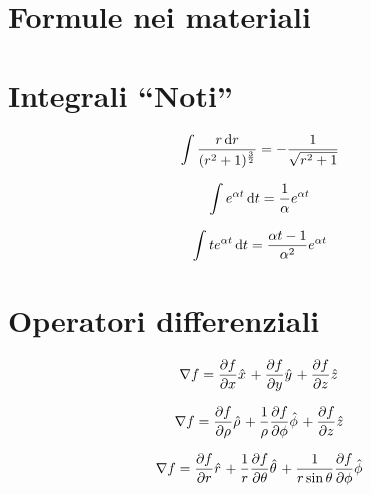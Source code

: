 \documentclass[a4paper,10pt]{article}
\begin{document}
\begin{multicols}{2}

\section{Formule nei materiali}


\section{Integrali ``Noti''}
\begin{equation*}
  \int \frac{r \,\mathrm d r}{(r^2+1)^{\frac{3}{2}}} = - \frac{1}{\sqrt{r^2 + 1}}
\end{equation*}

\begin{equation*}
  \int e^{\alpha t} \,\mathrm d t = \frac{1}{\alpha} e^{\alpha t}
\end{equation*}

\begin{equation*}
  \int t e^{\alpha t} \,\mathrm d t = \frac{\alpha t - 1}{\alpha^2} e^{\alpha t}
\end{equation*}

\section{Operatori differenziali}

  \begin{equation*}
    \grad f = \dep{f}{x} \hat{x} +
    \dep{f}{y} \hat{y} +
    \dep{f}{z} \hat{z}
  \end{equation*}
  
  \begin{equation*}
    \grad f = \dep{f}{\rho} \hat{\rho} +
    \frac{1}{\rho} \dep{f}{\phi} \hat{\phi} +
    \dep{f}{z} \hat{z}
  \end{equation*}
  
  \begin{equation*}
    \grad f = \dep{f}{r} \hat{r} +
    \frac{1}{r} \dep{f}{\theta} \hat{\theta} +
    \frac{1}{r \sin \theta} \dep{f}{\phi} \hat{\phi}
  \end{equation*}
  

\end{multicols}
\end{document}
